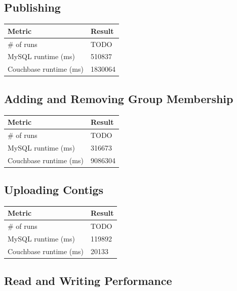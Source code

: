 \documentclass[]{IEEEtran}
\begin{document}
\subsection{Publishing}

\begin{center}
\begin{tabular}{|l|l|}
	\hline
	{\bf Metric} & {\bf Result} \\
	\hline
        \# of runs & TODO \\
        \hline
        MySQL runtime (ms) & 510837 \\
	\hline
        Couchbase runtime (ms) & 1830064 \\
        \hline
\end{tabular}
\end{center}

\subsection{Adding and Removing Group Membership}

\begin{center}
\begin{tabular}{|l|l|}
	\hline
	{\bf Metric} & {\bf Result} \\
	\hline
        \# of runs & TODO \\
        \hline
        MySQL runtime (ms) & 316673 \\
	\hline
        Couchbase runtime (ms) & 9086304 \\
        \hline
\end{tabular}
\end{center}

\subsection{Uploading Contigs}

\begin{center}
\begin{tabular}{|l|l|}
	\hline
	{\bf Metric} & {\bf Result} \\
	\hline
        \# of runs & TODO \\
        \hline
        MySQL runtime (ms) & 119892 \\
	\hline
        Couchbase runtime (ms) & 20133 \\
        \hline
\end{tabular}
\end{center}

\subsection{Read and Writing Performance}
\end{document}
